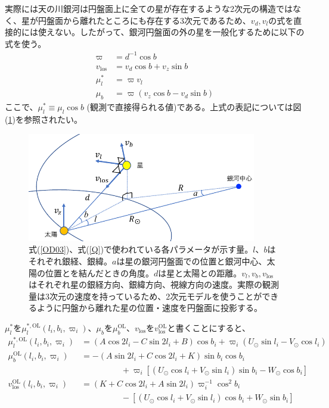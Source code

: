 実際には天の川銀河は円盤面上に全ての星が存在するような2次元の構造ではなく、星が円盤面から離れたところにも存在する3次元であるため、$v_d,v_l$の式を直接的には使えない。したがって、銀河円盤面の外の星を一般化するために以下の式を使う。
\begin{subequations}
\begin{align}
	\varpi &= d^{-1} \cos b \\
	v_{\mathrm{los}} &= v_d \cos b + v_z \sin b\\
	\mu^*_l &= \varpi v_l \\
	\mu_b &= \varpi(v_z \cos b - v_d \sin b)
\end{align} \label{OD03}
\end{subequations}
ここで、$\mu^*_l \equiv \mu_l \cos b$ (観測で直接得られる値)である。上式の表記については図(\ref{fig:OD03})を参照されたい。
\begin{figure}[htbp]
\begin{center}
	\includegraphics[width=10cm]{fig/figOD2003.pdf}
	\caption{式(\ref{OD03})、式(\ref{Q})で使われている各パラメータが示す量。$l、b$はそれぞれ銀経、銀緯。$a$は星の銀河円盤面での位置と銀河中心、太陽の位置とを結んだときの角度。$d$は星と太陽との距離。$v_l,v_b,v_{\mathrm{los}}$はそれぞれ星の銀経方向、銀緯方向、視線方向の速度。実際の観測量は3次元の速度を持っているため、2次元モデルを使うことができるように円盤から離れた星の位置・速度を円盤面に投影する。}
	\label{fig:OD03}
\end{center}
\end{figure}
$\mu^*_l$を$\mu^{*,\mathrm{OL}}_l(l_i,b_i,\varpi_i)$、$\mu_b$を$\mu^{\mathrm{OL}}_b$、$v_{\mathrm{los}}$を$v^{\mathrm{OL}}_{\mathrm{los}}$と書くことにすると、
\begin{subequations}
\begin{align}
	\mu^{*,\mathrm{OL}}_l(l_i,b_i,\varpi_i) &= (A\cos2l_i - C\sin2l_i + B)\cos b_i + \varpi_i(U_{\odot}\sin l_i - V_{\odot}\cos l_i) \\
	\mu^{\mathrm{OL}}_b(l_i,b_i,\varpi_i) &= -(A\sin2l_i + C\cos2l_i + K)\sin b_i \cos b_i \nonumber \\
	                          & \hspace{2cm} + \varpi_i[(U_{\odot}\cos l_i + V_{\odot} \sin l_i)\sin b_i - W_{\odot} \cos b_i] \\
	v^{\mathrm{OL}}_{\mathrm{los}}(l_i,b_i,\varpi_i) &= (K + C\cos2l_i + A\sin2l_i)\varpi_i^{-1}  \cos^2 b_i \nonumber\\
	                      & \hspace{2cm} - [(U_{\odot}\cos l_i + V_{\odot} \sin l_i)\cos b_i + W_{\odot} \sin b_i]
\end{align} \label{ObsEq}
\end{subequations}

